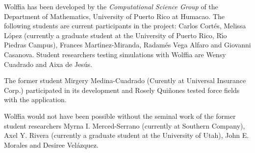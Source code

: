 \documentclass{article}
\begin{document}
Wolffia has been developed by the \textit{Computational Science Group} of the Department of Mathematics, University of Puerto Rico at Humacao.  The following students are current participants in the project: Carlos Cort\'es, Melissa L\'opez  (currently a graduate student at the University of Puerto Rico, R\'{\i}o Piedras Campus), Frances Mart\'{\i}nez-Miranda, Radam\'es Vega Alfaro and Giovanni Casanova.
Student researchers testing simulations with Wolffia are   Wensy Cuadrado and Aixa de Jes\'us. 

The former student Mirgery Medina-Cuadrado (Curently at Universal Insurance Corp.) participated in its development and Rosely Qui\~nones tested force fields with the application.

Wolffia would not have been possible without the seminal work of the  former student researchers Myrna I. Merced-Serrano (currently at Southern Company), Axel Y. Rivera (currently a graduate student at the University of Utah), John E. Morales and Desiree Vel\'azquez.





%
%
\printbibliography
\end{document}
